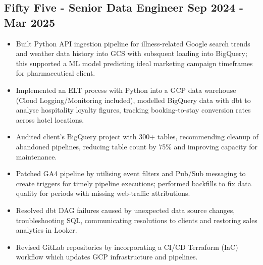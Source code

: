 \documentclass[a4paper, 10pt]{article}
\begin{document}
\subsection*{\textbf{Fifty Five - Senior Data Engineer} \hfill  Sep 2024 - Mar 2025}
\begin{itemize}[noitemsep]
    \item Built Python API ingestion pipeline for illness-related Google search trends and weather data history into GCS with subsquent loading into BigQuery; this supported a ML model predicting ideal marketing campaign timeframes for pharmaceutical client.
    \item Implemented an ELT process with Python into a GCP data warehouse (Cloud Logging/Monitoring included), modelled BigQuery data with dbt to analyse hospitality loyalty figures, tracking booking-to-stay conversion rates across hotel locations.
    \item Audited client's BigQuery project with 300+ tables, recommending cleanup of abandoned pipelines, reducing table count by 75\% and improving capacity for maintenance.
    \item Patched GA4 pipeline by utilising event filters and Pub/Sub messaging to create triggers for timely pipeline executions; performed backfills to fix data quality for periods with missing web-traffic attributions.
    \item Resolved dbt DAG failures caused by unexpected data source changes, troubleshooting SQL, communicating resolutions to clients and restoring sales analytics in Looker.
    \item Revised GitLab repositories by incorporating a CI/CD Terraform (IaC) workflow which updates GCP infrastructure and pipelines.
\end{itemize}
\end{document}
